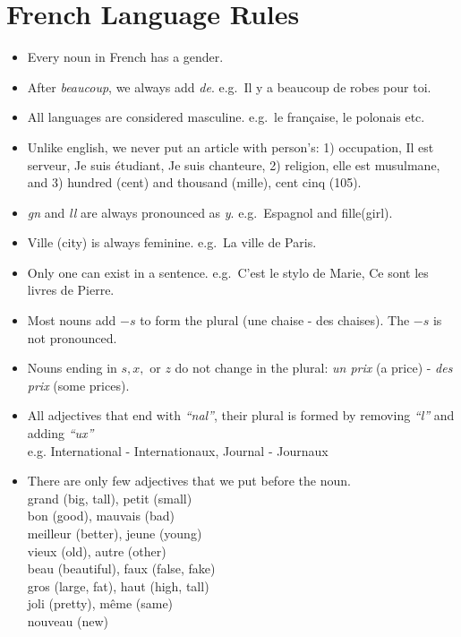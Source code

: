 \section{French Language Rules}

\begin{itemize}

\item{Every noun in French has a gender.}

\item{After \emph{beaucoup}, we always add \emph{de}. e.g.\ Il y a beaucoup de
robes pour toi.}

\item{All languages are considered masculine. e.g.\ le fran\c{c}aise, le polonais
etc.}

\item{Unlike english, we never put an article with person's:
1) occupation, Il est serveur, Je suis \'etudiant, Je suis chanteure,
2) religion, elle est musulmane, and
3) hundred (cent) and thousand (mille), cent cinq (105).}

\item{\emph{gn} and \emph{ll} are always pronounced as \emph{y}. e.g.\ Espagnol and fille(girl).}

\item{Ville (city) is always feminine. e.g.\ La ville de Paris.}

\item{Only one can exist in a sentence. e.g.\ C'est le stylo de Marie, Ce sont les livres de Pierre.}

\item{Most nouns add $-s$ to form the plural (une chaise - des chaises).
The $-s$ is not pronounced.}

\item{Nouns ending in $s, x,$ or $z$ do not change in the plural:
\emph{un prix} (a price) - \emph{des prix} (some prices).}

\item{All adjectives that end with \emph{``nal''}, their plural is formed by removing
\emph{``l''} and adding \emph{``ux''}\\
e.g. International - Internationaux, Journal - Journaux}

\item{There are only few adjectives that we put before the noun.\\
grand (big, tall), petit (small)	 \\
bon (good), mauvais (bad) \\
meilleur (better), jeune (young)\\
vieux (old), autre (other) \\
beau (beautiful), faux (false, fake) \\
gros (large, fat), haut (high, tall) \\
joli (pretty), même (same) \\
nouveau (new)}


\end{itemize}
